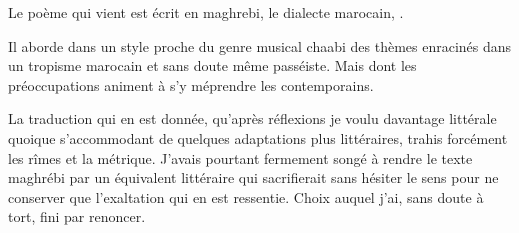 \begin{prose}
  Le poème qui vient est écrit en maghrebi, le dialecte marocain, .

  Il aborde dans un style proche du genre musical chaabi  des thèmes enracinés dans un tropisme marocain et sans doute même passéiste. Mais dont les préoccupations animent à s’y méprendre les contemporains.

  La traduction qui en est donnée, qu’après réflexions je voulu davantage littérale quoique s’accommodant de quelques adaptations plus littéraires, trahis forcément les rîmes et la métrique.
  J’avais pourtant fermement songé à rendre le texte maghrébi par un équivalent littéraire qui sacrifierait sans hésiter le sens pour ne conserver que l’exaltation qui en est ressentie. Choix auquel j’ai, sans doute à tort, fini par renoncer.
\end{prose}

